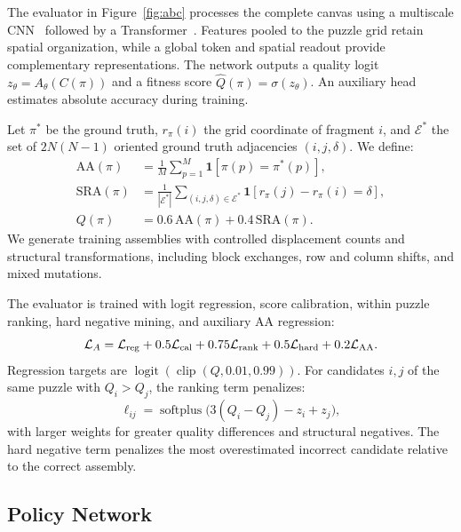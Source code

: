 \documentclass[10pt,twocolumn,letterpaper]{article}
\begin{document}
\par{}
The evaluator in Figure~\ref{fig:abc} processes the complete canvas using a multiscale CNN~\cite{woo2023convnextv2} followed by a Transformer~\cite{vaswani2017attention}. Features pooled to the puzzle grid retain spatial organization, while a global token and spatial readout provide complementary representations. The network outputs a quality logit $z_\theta=A_\theta(C(\pi))$ and a fitness score $\hat Q(\pi)=\sigma(z_\theta)$. An auxiliary head estimates absolute accuracy during training.
\par{}
Let $\pi^*$ be the ground truth, $r_\pi(i)$ the grid coordinate of fragment $i$, and $\mathcal E^*$ the set of $2N(N-1)$ oriented ground truth adjacencies $(i,j,\delta)$. We define:
\begin{align}
\mathrm{AA}(\pi)&=\frac1M\sum_{p=1}^{M}\mathbf1[\pi(p)=\pi^*(p)],\label{eq:gp-aa}\\
\mathrm{SRA}(\pi)&=\frac1{|\mathcal E^*|}\sum_{(i,j,\delta)\in\mathcal E^*}
\mathbf1[r_\pi(j)-r_\pi(i)=\delta],\label{eq:gp-sra}\\
Q(\pi)&=0.6\,\mathrm{AA}(\pi)+0.4\,\mathrm{SRA}(\pi).
\label{eq:gp-quality}
\end{align}
We generate training assemblies with controlled displacement counts and structural transformations, including block exchanges, row and column shifts, and mixed mutations.
\par{}
The evaluator is trained with logit regression, score calibration, within puzzle ranking, hard negative mining, and auxiliary AA regression:
\begin{equation}
\mathcal L_A=\mathcal L_{\rm reg}+0.5\mathcal L_{\rm cal}
+0.75\mathcal L_{\rm rank}+0.5\mathcal L_{\rm hard}
+0.2\mathcal L_{\rm AA}.
\label{eq:gp-a-loss}
\end{equation}
Regression targets are $\operatorname{logit}(\operatorname{clip}(Q,0.01,0.99))$. For candidates $i,j$ of the same puzzle with $Q_i>Q_j$, the ranking term penalizes:
\begin{equation}
\ell_{ij}=\operatorname{softplus}\bigl(3(Q_i-Q_j)-z_i+z_j\bigr),
\label{eq:gp-rank}
\end{equation}
with larger weights for greater quality differences and structural negatives. The hard negative term penalizes the most overestimated incorrect candidate relative to the correct assembly.

\subsection{Policy Network}
\label{sec:placement-policy}
\end{document}

